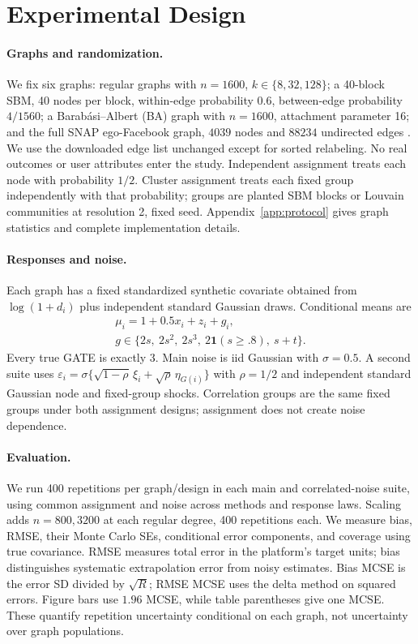 \documentclass{article}
\newcommand{\one}{\mathbf 1}
\begin{document}
\section{Experimental Design}
\paragraph{Graphs and randomization.}
We fix six graphs: regular graphs with $n=1600$, $k\in\{8,32,128\}$; a 40-block SBM, 40 nodes per block, within-edge probability $0.6$, between-edge probability $4/1560$; a Barab\'asi--Albert (BA) graph with $n=1600$, attachment parameter 16; and the full SNAP ego-Facebook graph, $4039$ nodes and $88234$ undirected edges \citep{snap}. We use the downloaded edge list unchanged except for sorted relabeling. No real outcomes or user attributes enter the study. Independent assignment treats each node with probability $1/2$. Cluster assignment treats each fixed group independently with that probability; groups are planted SBM blocks or Louvain communities at resolution 2, fixed seed. Appendix~\ref{app:protocol} gives graph statistics and complete implementation details.

\paragraph{Responses and noise.}
Each graph has a fixed standardized synthetic covariate obtained from $\log(1+d_i)$ plus independent standard Gaussian draws. Conditional means are
\begin{equation}
\begin{gathered}
\mu_i=1+0.5x_i+z_i+g_i,\\
g\in\{2s,\ 2s^2,\ 2s^3,\ 2\one(s\ge.8),\ s+t\}.
\end{gathered}
\end{equation}
Every true GATE is exactly 3. Main noise is iid Gaussian with $\sigma=0.5$. A second suite uses $\varepsilon_i=\sigma\{\sqrt{1-\rho}\,\xi_i+\sqrt\rho\,\eta_{G(i)}\}$ with $\rho=1/2$ and independent standard Gaussian node and fixed-group shocks. Correlation groups are the same fixed groups under both assignment designs; assignment does not create noise dependence.

\paragraph{Evaluation.}
We run 400 repetitions per graph/design in each main and correlated-noise suite, using common assignment and noise across methods and response laws. Scaling adds $n=800,3200$ at each regular degree, 400 repetitions each. We measure bias, RMSE, their Monte Carlo SEs, conditional error components, and coverage using true covariance. RMSE measures total error in the platform's target units; bias distinguishes systematic extrapolation error from noisy estimates. Bias MCSE is the error SD divided by $\sqrt R$; RMSE MCSE uses the delta method on squared errors. Figure bars use $1.96$ MCSE, while table parentheses give one MCSE. These quantify repetition uncertainty conditional on each graph, not uncertainty over graph populations.
\end{document}
